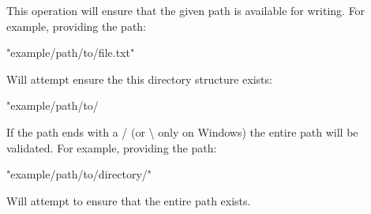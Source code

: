 This operation will ensure that the given path is available for writing. For example, providing the path\+: 
\begin{DoxyCode}
\textcolor{stringliteral}{"example/path/to/file.txt"}
\end{DoxyCode}
 Will attempt ensure the this directory structure exists\+: 
\begin{DoxyCode}
\textcolor{stringliteral}{"example/path/to/}
\end{DoxyCode}
 If the path ends with a \textquotesingle{}/\textquotesingle{} (or \textquotesingle{}\textbackslash{}\textquotesingle{} only on Windows) the entire path will be validated. For example, providing the path\+: 
\begin{DoxyCode}
\textcolor{stringliteral}{"example/path/to/directory/"}
\end{DoxyCode}
 Will attempt to ensure that the entire path exists. 